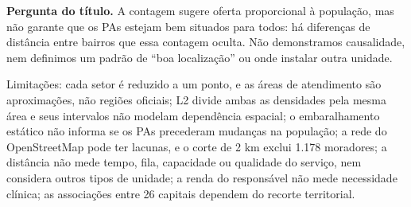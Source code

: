 \documentclass[10pt,a4paper,twocolumn]{article}
\begin{document}
\textbf{Pergunta do título.} A contagem sugere oferta proporcional à população, mas não garante que os PAs estejam bem situados para todos: há diferenças de distância entre bairros que essa contagem oculta. Não demonstramos causalidade, nem definimos um padrão de ``boa localização'' ou onde instalar outra unidade.

Limitações: cada setor é reduzido a um ponto, e as áreas de atendimento são aproximações, não regiões oficiais; L2 divide ambas as densidades pela mesma área e seus intervalos não modelam dependência espacial; o embaralhamento estático não informa se os PAs precederam mudanças na população; a rede do OpenStreetMap pode ter lacunas, e o corte de 2 km exclui 1.178 moradores; a distância não mede tempo, fila, capacidade ou qualidade do serviço, nem considera outros tipos de unidade; a renda do responsável não mede necessidade clínica; as associações entre 26 capitais dependem do recorte territorial.

{\footnotesize


}
\end{document}
